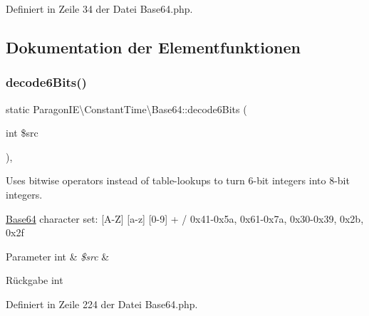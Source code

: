 Definiert in Zeile 34 der Datei Base64.\+php.



\subsection{Dokumentation der Elementfunktionen}
\mbox{\label{class_paragon_i_e_1_1_constant_time_1_1_base64_ad4f782db9d606b16599718a8ba876efc}} 
\subsubsection{\texorpdfstring{decode6\+Bits()}{decode6Bits()}}
{\footnotesize\ttfamily static Paragon\+I\+E\textbackslash{}\+Constant\+Time\textbackslash{}\+Base64\+::decode6\+Bits (\begin{DoxyParamCaption}\item[{int}]{\$src }\end{DoxyParamCaption})\hspace{0.3cm}{\ttfamily [static]}, {\ttfamily [protected]}}

Uses bitwise operators instead of table-\/lookups to turn 6-\/bit integers into 8-\/bit integers.

\mbox{\hyperlink{class_paragon_i_e_1_1_constant_time_1_1_base64}{Base64}} character set\+: \mbox{[}A-\/Z\mbox{]} \mbox{[}a-\/z\mbox{]} \mbox{[}0-\/9\mbox{]} + / 0x41-\/0x5a, 0x61-\/0x7a, 0x30-\/0x39, 0x2b, 0x2f


\begin{DoxyParams}[1]{Parameter}
int & {\em \$src} & \\
\hline
\end{DoxyParams}
\begin{DoxyReturn}{Rückgabe}
int 
\end{DoxyReturn}


Definiert in Zeile 224 der Datei Base64.\+php.

\mbox{\label{class_paragon_i_e_1_1_constant_time_1_1_base64_ac7133a444b198643a07447d558d43669}} 
